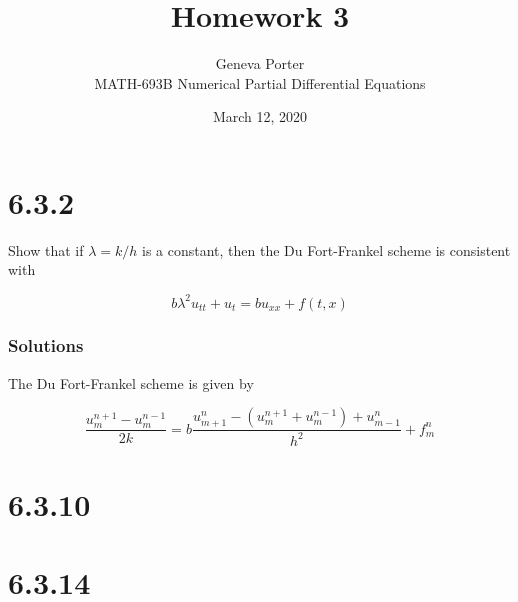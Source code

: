 \documentclass[12pt]{article}
\title{Homework 3}
\author{Geneva Porter\\ 
MATH-693B Numerical Partial Differential Equations\\}
\date{March 12, 2020}
\begin{document}
\maketitle

\section*{6.3.2}

Show that if $\lambda = k/h$ is a constant, then the Du Fort-Frankel scheme is consistent with

$$ b\lambda^2u_{tt} + u_t = bu_{xx} + f(t,x) $$

\subsubsection*{Solutions}

The Du Fort-Frankel scheme is given by

$$\frac{u_{m}^{n+1} - u_{m}^{n-1}}{2k} = b\frac{u_{m+1}^{n} - \left(u_{m}^{n+1} + u_{m}^{n-1} \right) + u_{m-1}^{n}}{h^2} + f_m^n $$

\section*{6.3.10}

\section*{6.3.14}
\end{document}
